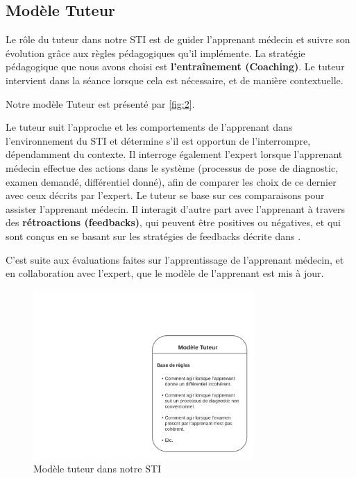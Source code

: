 \subsection{Modèle Tuteur}

Le rôle du tuteur dans notre STI est de guider l'apprenant médecin et suivre son évolution grâce aux règles pédagogiques qu'il implémente. La stratégie pédagogique que nous avons choisi est \textbf{l'entraînement (Coaching)}. Le tuteur intervient dans la séance lorsque cela est nécessaire, et de manière contextuelle.

Notre modèle Tuteur est présenté par \autoref{fig:2}.

Le tuteur suit l'approche et les comportements de l'apprenant dans l'environnement du STI et détermine s'il est opportun de l'interrompre, dépendamment du contexte. Il interroge également l'expert lorsque l'apprenant médecin effectue des actions dans le système (processus de pose de diagnostic, examen demandé, différentiel donné), afin de comparer les choix de ce dernier avec ceux décrits par l'expert. Le tuteur se base sur ces comparaisons pour assister l'apprenant médecin. Il interagit d'autre part avec l'apprenant à travers des \textbf{rétroactions (feedbacks)}, qui peuvent être positives ou négatives, et qui sont conçus en se basant sur les stratégies de feedbacks décrite dans \cite{narciss2008feedback}.

C'est suite aux évaluations faites sur l'apprentissage de l'apprenant médecin, et en collaboration avec l'expert, que le modèle de l'apprenant est mis à jour.
 \newpage
 
\begin{figure}
    \includegraphics[width=0.75\textwidth]{figures/mod_tuteur.png}
    \captionsetup{justification=centering}
    \caption{Modèle tuteur dans notre STI}
 \label{fig:2}
\end{figure}

